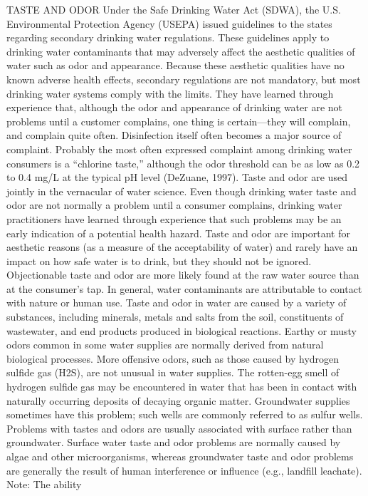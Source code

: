 \documentclass{article}
\begin{document}
TASTE AND ODOR Under the Safe Drinking Water Act (SDWA), the U.S.
Environmental Protection Agency (USEPA) issued guidelines to the states
regarding secondary drinking water regulations. These guidelines apply
to drinking water contaminants that may adversely affect the aesthetic
qualities of water such as odor and appearance. Because these aesthetic
qualities have no known adverse health effects, secondary regulations
are not mandatory, but most drinking water systems comply with the
limits. They have learned through experience that, although the odor and
appearance of drinking water are not problems until a customer
complains, one thing is certain---they will complain, and complain quite
often. Disinfection itself often becomes a major source of complaint.
Probably the most often expressed complaint among drinking water
consumers is a ``chlorine taste,'' although the odor threshold can be as
low as 0.2 to 0.4 mg/L at the typical pH level (DeZuane, 1997). Taste
and odor are used jointly in the vernacular of water science. Even
though drinking water taste and odor are not normally a problem until a
consumer complains, drinking water practitioners have learned through
experience that such problems may be an early indication of a potential
health hazard. Taste and odor are important for aesthetic reasons (as a
measure of the acceptability of water) and rarely have an impact on how
safe water is to drink, but they should not be ignored. Objectionable
taste and odor are more likely found at the raw water source than at the
consumer's tap. In general, water contaminants are attributable to
contact with nature or human use. Taste and odor in water are caused by
a variety of substances, including minerals, metals and salts from the
soil, constituents of wastewater, and end products produced in
biological reactions. Earthy or musty odors common in some water
supplies are normally derived from natural biological processes. More
offensive odors, such as those caused by hydrogen sulfide gas (H2S), are
not unusual in water supplies. The rotten-egg smell of hydrogen sulfide
gas may be encountered in water that has been in contact with naturally
occurring deposits of decaying organic matter. Groundwater supplies
sometimes have this problem; such wells are commonly referred to as
sulfur wells. Problems with tastes and odors are usually associated with
surface rather than groundwater. Surface water taste and odor problems
are normally caused by algae and other microorganisms, whereas
groundwater taste and odor problems are generally the result of human
interference or influence (e.g., landfill leachate). Note: The ability
\end{document}
